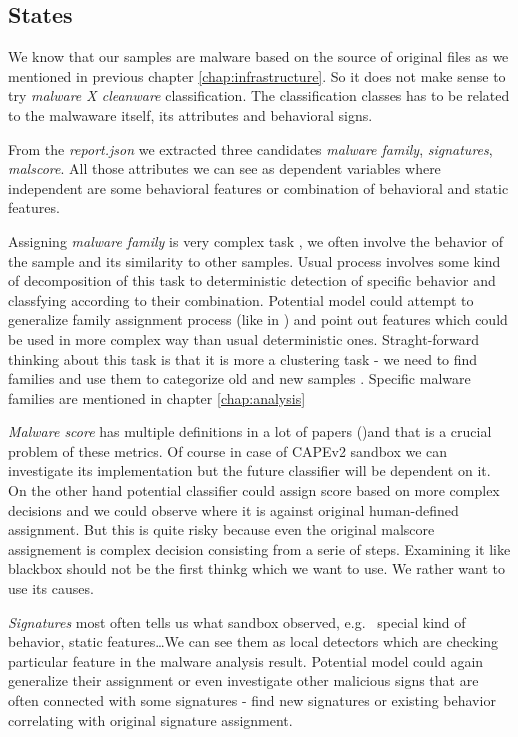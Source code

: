 \subsection{States}
We know that our samples are malware based on the source of original files as we mentioned in previous chapter \ref{chap:infrastructure}. So it does not make sense to try \emph{malware X cleanware} classification. The classification classes has to be related to the malwaware itself, its attributes and behavioral signs.

From the \emph{report.json} we extracted three candidates \emph{malware family}, \emph{signatures}, \emph{malscore}. All those attributes we can see as dependent variables where independent are some behavioral features or combination of behavioral and static features. 

Assigning \emph{malware family} is very complex task \cite{Gennari2011}, we often involve the behavior of the sample and its similarity to other samples. Usual process involves some kind of decomposition of this task to deterministic detection of specific behavior and classfying according to their combination. Potential model could attempt to generalize family assignment process (like in \cite{Rieck2008}) and point out features which could be used in more complex way than usual deterministic ones. Straght-forward thinking about this task is that it is more a clustering task - we need to find families and use them to categorize old and new samples \cite{Pitolli2017}. Specific malware families are mentioned in chapter \ref{chap:analysis}

\emph{Malware score} has multiple definitions in a lot of papers (\cite{Walker2019, Kumar2014})and that is a crucial problem of these metrics. Of course in case of CAPEv2 sandbox we can investigate its implementation but the future classifier will be dependent on it. On the other hand potential classifier could assign score based on more complex decisions and we could observe where it is against original human-defined assignment. But this is quite risky because even the original malscore assignement is complex decision consisting from a serie of steps. Examining it like blackbox should not be the first thinkg which we want to use. We rather want to use its causes.

\emph{Signatures} most often tells us what sandbox observed, e.g. \ special kind of behavior, static features\dots We can see them as local detectors which are checking particular feature in the malware analysis result. Potential model could again generalize their assignment or even investigate other malicious signs that are often connected with some signatures - find new signatures or existing behavior correlating with original signature assignment.


